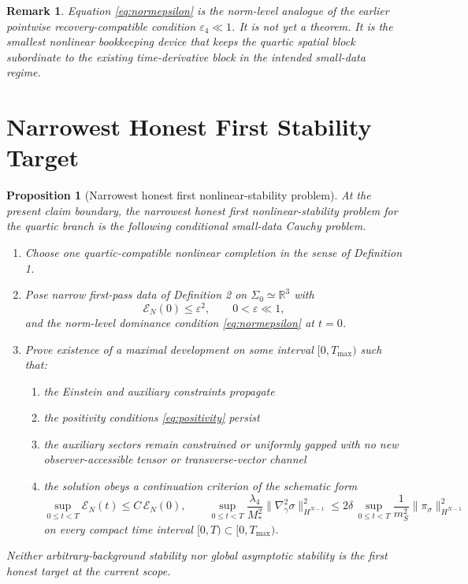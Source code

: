 \documentclass[11pt]{article}
\newtheorem{proposition}{Proposition}
\newtheorem{remark}{Remark}
\begin{document}
\begin{remark}
Equation \eqref{eq:normepsilon} is the norm-level analogue of the earlier pointwise recovery-compatible condition \(\varepsilon_4\ll 1\). It is not yet a theorem. It is the smallest nonlinear bookkeeping device that keeps the quartic spatial block subordinate to the existing time-derivative block in the intended small-data regime.
\end{remark}

\section{Narrowest Honest First Stability Target}

\begin{proposition}[Narrowest honest first nonlinear-stability problem]
At the present claim boundary, the narrowest honest first nonlinear-stability problem for the quartic branch is the following conditional small-data Cauchy problem.
\begin{enumerate}
    \item Choose one quartic-compatible nonlinear completion in the sense of Definition 1.
    \item Pose narrow first-pass data of Definition 2 on \(\Sigma_0\simeq\mathbb R^3\) with
    \begin{equation}
    \mathcal E_N(0)\le \varepsilon^2,
    \qquad
    0<\varepsilon\ll 1,
    \label{eq:smallness}
    \end{equation}
    and the norm-level dominance condition \eqref{eq:normepsilon} at \(t=0\).
    \item Prove existence of a maximal development on some interval \([0,T_{\max})\) such that:
    \begin{enumerate}
        \item the Einstein and auxiliary constraints propagate
        \item the positivity conditions \eqref{eq:positivity} persist
        \item the auxiliary sectors remain constrained or uniformly gapped with no new observer-accessible tensor or transverse-vector channel
        \item the solution obeys a continuation criterion of the schematic form
        \begin{equation}
        \sup_{0\le t<T}\mathcal E_N(t)\le C\,\mathcal E_N(0),
        \qquad
        \sup_{0\le t<T}
        \frac{\lambda_4}{M_*^2}\|\nabla_\gamma^2 \sigma\|_{H^{N-1}}^2
        \le 2\delta\,
        \sup_{0\le t<T}
        \frac{1}{m_S^2}\|\pi_\sigma\|_{H^{N-1}}^2
        \label{eq:continuation}
        \end{equation}
        on every compact time interval \([0,T)\subset [0,T_{\max})\).
    \end{enumerate}
\end{enumerate}
Neither arbitrary-background stability nor global asymptotic stability is the first honest target at the current scope.
\end{proposition}
\end{document}

